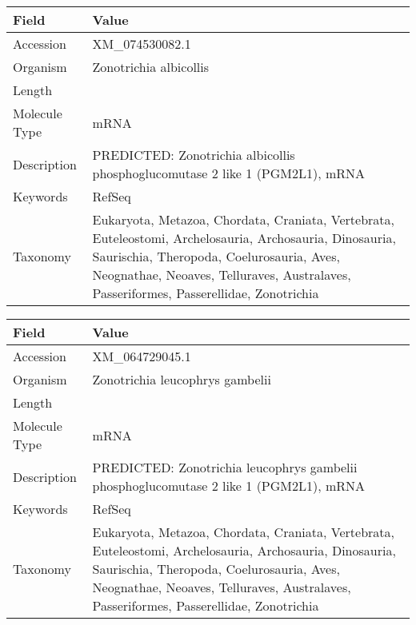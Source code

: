 \documentclass[10pt]{article}
\begin{document}
\vspace{1em}
{\footnotesize
\begin{longtable}{>{\raggedright\arraybackslash}p{4.5cm} >{\raggedright\arraybackslash}p{11.5cm}}
\textbf{Field} & \textbf{Value} \\
\hline
Accession & XM\_074530082.1 \\
Organism & Zonotrichia albicollis \\
Length & 5361 \\
Molecule Type & mRNA \\
Description & PREDICTED: Zonotrichia albicollis phosphoglucomutase 2 like 1 (PGM2L1), mRNA \\
Keywords & RefSeq \\
Taxonomy & Eukaryota, Metazoa, Chordata, Craniata, Vertebrata, Euteleostomi, Archelosauria, Archosauria, Dinosauria, Saurischia, Theropoda, Coelurosauria, Aves, Neognathae, Neoaves, Telluraves, Australaves, Passeriformes, Passerellidae, Zonotrichia \\
\end{longtable}
}

\vspace{1em}
{\footnotesize
\begin{longtable}{>{\raggedright\arraybackslash}p{4.5cm} >{\raggedright\arraybackslash}p{11.5cm}}
\textbf{Field} & \textbf{Value} \\
\hline
Accession & XM\_064729045.1 \\
Organism & Zonotrichia leucophrys gambelii \\
Length & 5362 \\
Molecule Type & mRNA \\
Description & PREDICTED: Zonotrichia leucophrys gambelii phosphoglucomutase 2 like 1 (PGM2L1), mRNA \\
Keywords & RefSeq \\
Taxonomy & Eukaryota, Metazoa, Chordata, Craniata, Vertebrata, Euteleostomi, Archelosauria, Archosauria, Dinosauria, Saurischia, Theropoda, Coelurosauria, Aves, Neognathae, Neoaves, Telluraves, Australaves, Passeriformes, Passerellidae, Zonotrichia \\
\end{longtable}
}
\end{document}
